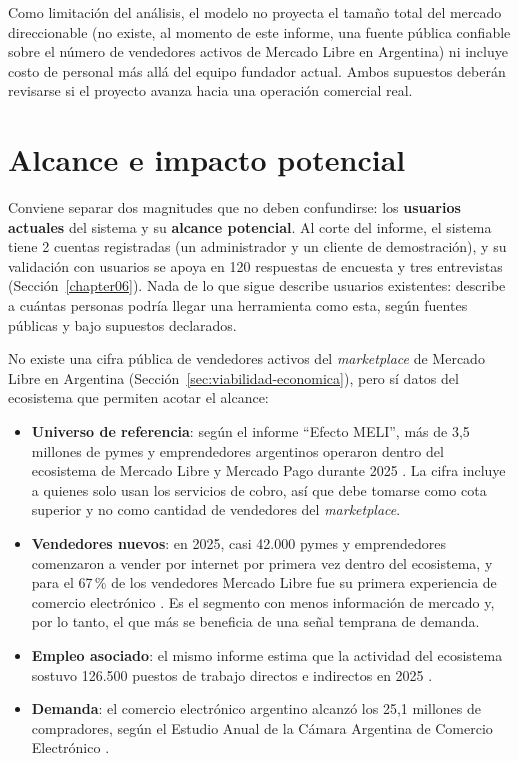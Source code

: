 Como limitación del análisis, el modelo no proyecta el tamaño total del mercado direccionable (no existe, al momento de este informe, una fuente pública confiable sobre el número de vendedores activos de Mercado Libre en Argentina) ni incluye costo de personal más allá del equipo fundador actual. Ambos supuestos deberán revisarse si el proyecto avanza hacia una operación comercial real.

\section{Alcance e impacto potencial}\label{sec:impacto}

Conviene separar dos magnitudes que no deben confundirse: los \textbf{usuarios actuales} del sistema y su \textbf{alcance potencial}. Al corte del informe, el sistema tiene 2 cuentas registradas (un administrador y un cliente de demostración), y su validación con usuarios se apoya en 120 respuestas de encuesta y tres entrevistas (Sección~\ref{chapter06}). Nada de lo que sigue describe usuarios existentes: describe a cuántas personas podría llegar una herramienta como esta, según fuentes públicas y bajo supuestos declarados.

No existe una cifra pública de vendedores activos del \emph{marketplace} de Mercado Libre en Argentina (Sección~\ref{sec:viabilidad-economica}), pero sí datos del ecosistema que permiten acotar el alcance:

\begin{itemize}
	\item \textbf{Universo de referencia}: según el informe ``Efecto MELI'', más de 3,5 millones de pymes y emprendedores argentinos operaron dentro del ecosistema de Mercado Libre y Mercado Pago durante 2025 \parencite{Sainz2026}. La cifra incluye a quienes solo usan los servicios de cobro, así que debe tomarse como cota superior y no como cantidad de vendedores del \emph{marketplace}.
	\item \textbf{Vendedores nuevos}: en 2025, casi 42.000 pymes y emprendedores comenzaron a vender por internet por primera vez dentro del ecosistema, y para el 67\,\% de los vendedores Mercado Libre fue su primera experiencia de comercio electrónico \parencite{Sainz2026}. Es el segmento con menos información de mercado y, por lo tanto, el que más se beneficia de una señal temprana de demanda.
	\item \textbf{Empleo asociado}: el mismo informe estima que la actividad del ecosistema sostuvo 126.500 puestos de trabajo directos e indirectos en 2025 \parencite{Sainz2026}.
	\item \textbf{Demanda}: el comercio electrónico argentino alcanzó los 25,1 millones de compradores, según el Estudio Anual de la Cámara Argentina de Comercio Electrónico \parencite{CACE2025}.
\end{itemize}

